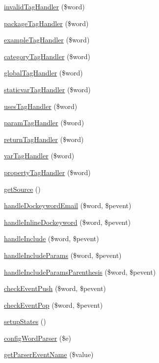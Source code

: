 \begin{DoxyCompactItemize}
\hyperlink{class_parser_add786762b421f9fab030fb1592eb5277}{invalid\-Tag\-Handler} (\$word)
\item 
\hyperlink{class_parser_a8a5605f7949d2df81fbf0fd55f3872a7}{package\-Tag\-Handler} (\$word)
\item 
\hyperlink{class_parser_aedd87c18774ca5262e14f1e7f7a295b3}{example\-Tag\-Handler} (\$word)
\item 
\hyperlink{class_parser_a41e171c806af12290273b6e45d35c39e}{category\-Tag\-Handler} (\$word)
\item 
\hyperlink{class_parser_afbfc926d14e423ba186340234c12335e}{global\-Tag\-Handler} (\$word)
\item 
\hyperlink{class_parser_a5195374f487dd9098cb995f021e1fe7e}{staticvar\-Tag\-Handler} (\$word)
\item 
\hyperlink{class_parser_ad3e99f8fa1da4e7ed4cddec8a70c6fc1}{uses\-Tag\-Handler} (\$word)
\item 
\hyperlink{class_parser_a6b81244ed704d2c82c8561d85d0b3605}{param\-Tag\-Handler} (\$word)
\item 
\hyperlink{class_parser_aa1a0819a967b9e3cb8bd97cb780ea639}{return\-Tag\-Handler} (\$word)
\item 
\hyperlink{class_parser_a527afbf31dc69bf05afa1484bccdc637}{var\-Tag\-Handler} (\$word)
\item 
\hyperlink{class_parser_aad70039f9a87f22549f15e37b5c95e02}{property\-Tag\-Handler} (\$word)
\item 
\hyperlink{class_parser_a42fdd8313c99d9c5f80219c1e192b93a}{get\-Source} ()
\item 
\hyperlink{class_parser_a897dd33b40e54bdfcdf529ee11539b8f}{handle\-Dockeyword\-Email} (\$word, \$pevent)
\item 
\hyperlink{class_parser_ae3644280a89428ea2a91213fb83d9027}{handle\-Inline\-Dockeyword} (\$word, \$pevent)
\item 
\hyperlink{class_parser_a1b742d68b058777a3f988586ef65cfa8}{handle\-Include} (\$word, \$pevent)
\item 
\hyperlink{class_parser_a1ccec62796a1533aec70e714836f5308}{handle\-Include\-Params} (\$word, \$pevent)
\item 
\hyperlink{class_parser_a94e6ccd54479e64f549a79423be75220}{handle\-Include\-Params\-Parenthesis} (\$word, \$pevent)
\item 
\hyperlink{class_parser_a912ba83822697d200d7e2771166f6718}{check\-Event\-Push} (\$word, \$pevent)
\item 
\hyperlink{class_parser_a9f5347fcba49d2192e689e417671ce18}{check\-Event\-Pop} (\$word, \$pevent)
\item 
\hyperlink{class_parser_abe4d21ebe5f9d4088e7be4271603cd5e}{setup\-States} ()
\item 
\hyperlink{class_parser_a283368f67f931488905c6f3f84b1c549}{config\-Word\-Parser} (\$e)
\item 
\hyperlink{class_parser_a9cc8a14f4bce21f0058f33036a2eb460}{get\-Parser\-Event\-Name} (\$value)
\end{DoxyCompactItemize}
